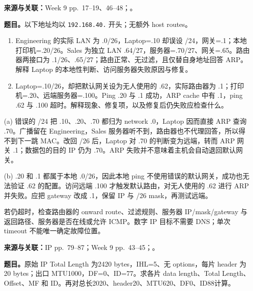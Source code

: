 
\textbf{来源与关联：}Week 9 pp.~17--19、46--48；。

\textbf{题目。}以下地址均以 \texttt{192.168.40.} 开头；无额外 host routes。
\begin{enumerate}[label=(\alph*)]
 \item Engineering 的实际 LAN 为 .0/26，Laptop=.10 却误设 /24，网关=.1；本地打印机=.20/26。Sales 为独立 LAN .64/27，服务器=.70/27、网关=.65。路由器两接口为 .1/26、.65/27；路由正常、无过滤，且仅替自身地址回答 ARP。解释 Laptop 的本地性判断、访问服务器失败原因与修复。
 \item Laptop=.10/26，却把默认网关设为无人使用的 .62，实际路由器为 .1；打印机=.20、远端服务器=.100。Ping .20 与 .1 成功，ARP cache 中有 .1，ping .62 与 .100 超时。解释现象、修复项，以及修复后仍失败应检查什么。
\end{enumerate}

\begin{workedsolution}
(a) 错误的 /24 把 .10、.20、.70 都归为 network .0，Laptop 因而直接 ARP 查询 .70。广播留在 Engineering，Sales 服务器听不到，路由器也不代理回答，所以得不到下一跳 MAC。改回 /26 后，Laptop 对 .70 的判断变为远端，转而 ARP 网关 .1；数据包的目的 IP 仍为 .70。ARP 失败并不意味着主机会自动退回默认网关。

(b) .20 和 .1 都属于本地 .0/26，因此本地 ping 不使用错误的默认网关，成功也无法验证 .62 的配置。访问远端 .100 才触发默认路由，对无人使用的 .62 进行 ARP 并失败。应把 gateway 改成 .1，保留 IP 与 /26 mask，再测试远端。

若仍超时，检查路由器的 onward route、过滤规则、服务器 IP/mask/gateway 与返回路径、服务器是否在线或允许 ICMP。数字 IP 目标不需要 DNS；单次 timeout 不能唯一确定故障位置。
\end{workedsolution}


\textbf{来源与关联：}IP pp.~79--87；Week 9 pp.~43--45；。

\textbf{题目。}原始 IP Total Length 为2420 bytes，IHL=5、无 options，每片 header 为20 bytes；出口 MTU1000，DF=0、ID=77。求各片 data length、Total Length、Offset、MF 和 ID。再对总长2020、header20、MTU620、DF0、ID88计算。

